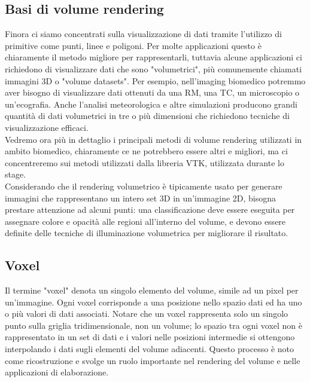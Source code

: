 \subsection{Basi di volume rendering}\label{sec:volume-rendering-details}
Finora ci siamo concentrati sulla visualizzazione di dati tramite l'utilizzo di primitive come punti, linee e poligoni. Per molte applicazioni questo è chiaramente il metodo migliore per rappresentarli, tuttavia alcune applicazioni ci richiedono di visualizzare dati che sono "volumetrici", più comunemente chiamati immagini 3D o "volume datasets". Per esempio, nell'imaging biomedico potremmo aver bisogno di visualizzare dati ottenuti da una RM, una TC, un microscopio o un'ecografia. Anche l'analisi meteorologica e altre simulazioni producono grandi quantità di dati volumetrici in tre o più dimensioni che richiedono tecniche di visualizzazione efficaci.
\\
Vedremo ora più in dettaglio i principali metodi di volume rendering utilizzati in ambito biomedico, chiaramente ce ne potrebbero essere altri e migliori, ma ci concentreremo sui metodi utilizzati dalla libreria VTK, utilizzata durante lo stage.
\\
Considerando che il rendering volumetrico è tipicamente usato per generare immagini che rappresentano un intero set 3D in un'immagine 2D, bisogna prestare attenzione ad alcuni punti: una classificazione deve essere eseguita per assegnare colore e opacità alle regioni all'interno del volume, e devono essere definite delle tecniche di illuminazione volumetrica per migliorare il risultato.

\subsection{Voxel}
Il termine "voxel" denota un singolo elemento del volume, simile ad un pixel per un'immagine. Ogni voxel corrisponde a una posizione nello spazio dati ed ha uno o più valori di dati associati. Notare che un voxel rappresenta solo un singolo punto sulla griglia tridimensionale, non un volume; lo spazio tra ogni voxel non è rappresentato in un set di dati e i valori nelle posizioni intermedie si ottengono interpolando i dati sugli elementi del volume adiacenti. Questo processo è noto come ricostruzione e svolge un ruolo importante nel rendering del volume e nelle applicazioni di elaborazione.

